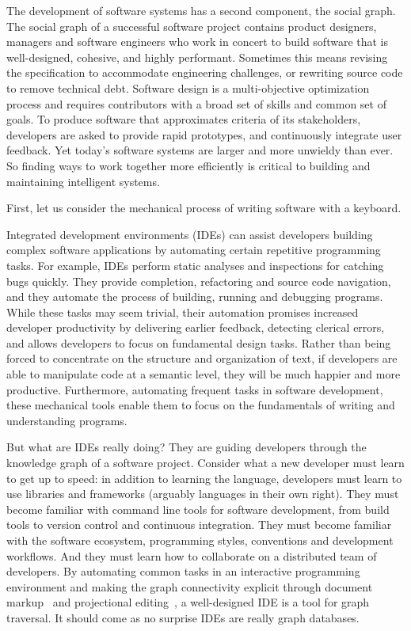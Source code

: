 \documentclass[12pt,initial,twoside,maitrise]{dms}
\numberwithin{equation}{section}
\numberwithin{table}{chapter}
\numberwithin{figure}{chapter}
\begin{document}
The development of software systems has a second component, the social graph. The social graph of a successful software project contains product designers, managers and software engineers who work in concert to build software that is well-designed, cohesive, and highly performant. Sometimes this means revising the specification to accommodate engineering challenges, or rewriting source code to remove technical debt. Software design is a multi-objective optimization process and requires contributors with a broad set of skills and common set of goals. To produce software that approximates criteria of its stakeholders, developers are asked to provide rapid prototypes, and continuously integrate user feedback. Yet today's software systems are larger and more unwieldy than ever. So finding ways to work together more efficiently is critical to building and maintaining intelligent systems.

First, let us consider the mechanical process of writing software with a keyboard.

Integrated development environments (IDEs) can assist developers building complex software applications by automating certain repetitive programming tasks. For example, IDEs perform static analyses and inspections for catching bugs quickly. They provide completion, refactoring and source code navigation, and they automate the process of building, running and debugging programs. While these tasks may seem trivial, their automation promises increased developer productivity by delivering earlier feedback, detecting clerical errors, and allows developers to focus on fundamental design tasks. Rather than being forced to concentrate on the structure and organization of text, if developers are able to manipulate code at a semantic level, they will be much happier and more productive. Furthermore, automating frequent tasks in software development, these mechanical tools enable them to focus on the fundamentals of writing and understanding programs.

But what are IDEs really doing? They are guiding developers through the knowledge graph of a software project. Consider what a new developer must learn to get up to speed: in addition to learning the language, developers must learn to use libraries and frameworks (arguably languages in their own right). They must become familiar with command line tools for software development, from build tools to version control and continuous integration. They must become familiar with the software ecosystem, programming styles, conventions and development workflows. And they must learn how to collaborate on a distributed team of developers. By automating common tasks in an interactive programming environment and making the graph connectivity explicit through document markup~\citep{goldfarb1981generalized} and projectional editing~\citep{voelter2014towards}, a well-designed IDE is a tool for graph traversal. It should come as no surprise IDEs are really graph databases.
\end{document}
